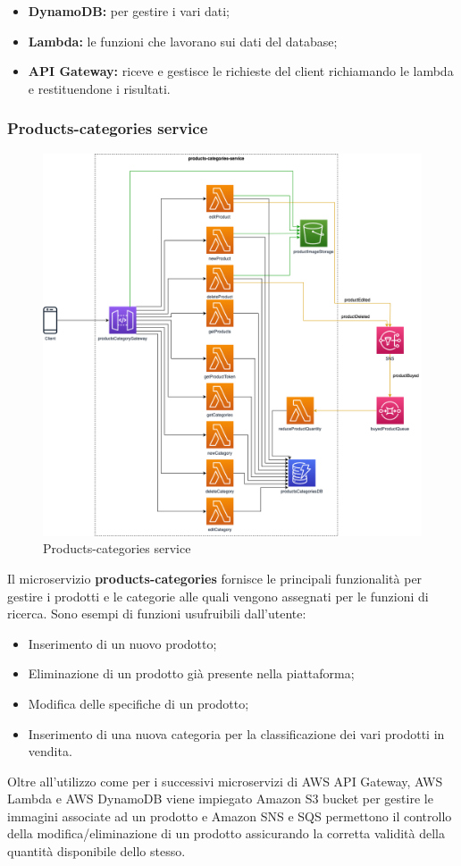 \begin{itemize}
	\item \textbf{DynamoDB:} per gestire i vari dati;
	\item \textbf{Lambda:} le funzioni che lavorano sui dati del database;
	\item \textbf{API Gateway:} riceve e gestisce le richieste del client richiamando le lambda e restituendone i risultati.
\end{itemize}

\subsubsection{Products-categories service}
\begin{figure}[H]
	\centering
	\includegraphics[scale=0.4]{Immagini/Backend/AWSProductsCategories.png}
	\caption{Products-categories service}
	\label{fig:ProductCategories}
\end{figure}
Il microservizio \textbf{products-categories} fornisce le principali funzionalità per gestire i prodotti e le categorie alle quali vengono assegnati per le funzioni di ricerca. Sono esempi di funzioni usufruibili dall'utente:
\begin{itemize}
	\item Inserimento di un nuovo prodotto;
	\item Eliminazione di un prodotto già presente nella piattaforma;
	\item Modifica delle specifiche di un prodotto;
	\item Inserimento di una nuova categoria per la classificazione dei vari prodotti in vendita.
\end{itemize}\noindent
Oltre all'utilizzo come per i successivi microservizi di AWS API Gateway, AWS Lambda e AWS DynamoDB viene impiegato Amazon S3 bucket per gestire le immagini associate ad un prodotto e Amazon SNS e SQS permettono il controllo della modifica/eliminazione di un prodotto assicurando la corretta validità della quantità disponibile dello stesso.

